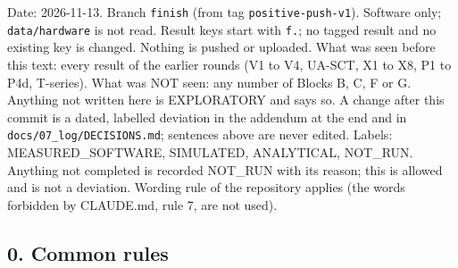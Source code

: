 


Date: 2026-11-13. Branch \texttt{finish} (from tag \texttt{positive-push-v1}). Software only; \texttt{data/hardware} is not read. Result keys start with \texttt{f.}; no tagged result and no existing key is changed. Nothing is pushed or uploaded.
What was seen before this text: every result of the earlier rounds (V1 to V4, UA-SCT, X1 to X8, P1 to P4d, T-series). What was NOT seen: any number of Blocks B, C, F or G. Anything not written here is EXPLORATORY and says so. A change after this commit is a dated, labelled deviation in the addendum at the end and in \texttt{docs/07\_log/DECISIONS.md}; sentences above are never edited.
Labels: MEASURED\_SOFTWARE, SIMULATED, ANALYTICAL, NOT\_RUN. Anything not completed is recorded NOT\_RUN with its reason; this is allowed and is not a deviation. Wording rule of the repository applies (the words forbidden by CLAUDE.md, rule 7, are not used).

\subsection*{0. Common rules}

